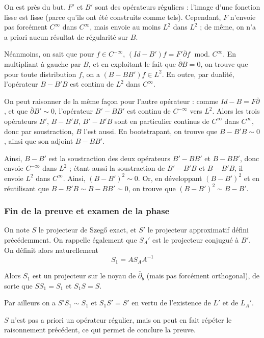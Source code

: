 On est près du but. $F'$ et $B'$ sont des opérateurs réguliers : l'image d'une fonction lisse est lisse (parce qu'ils ont été construits comme tels). Cependant, $F$ n'envoie pas forcément $C^{\infty}$ dans $C^{\infty}$, mais envoie au moins $L^2$ dans $L^2$ ; de même, on n'a a priori aucun résultat de régularité sur $B$.

Néanmoins, on sait que pour $f \in C^{-\infty}$, $(Id-B')f = F'\overline{\partial}f\; \text{ mod. } C^{\infty}$. En multipliant à gauche par $B$, et en exploitant le fait que $\overline{\partial}B=0$, on trouve que pour toute distribution $f$, on a $(B-BB')f \in L^2$. En outre, par dualité, l'opérateur $B-B'B$ est continu de $L^2$ dans $C^{\infty}$.

On peut raisonner de la même façon pour l'autre opérateur : comme $Id-B = F\overline{\partial}$, et que $\overline{\partial}B' \sim 0$, l'opérateur $B'-BB'$ est continu de $C^{-\infty}$ vers $L^2$. Alors les trois opérateurs $B'$, $B-B'B$, $B'-B'B$ sont en particulier continus de $C^{\infty}$ dans $C^{\infty}$, donc par soustraction, $B$ l'est aussi. En bootstrapant, on trouve que $B-B'B \sim 0$, ainsi que son adjoint $B-BB'$.

Ainsi, $B-B'$ est la soustraction des deux opérateurs $B'-BB'$ et $B-BB'$, donc envoie $C^{-\infty}$ dans $L^2$ ; étant aussi la soustraction de $B'-B'B$ et $B-B'B$, il envoie $L^2$ dans $C^{\infty}$. Ainsi, $(B-B')^2 \sim 0$. Or, en développant $(B-B')^2$ et en réutilisant que $B-B'B \sim B-BB' \sim 0$, on trouve que $(B-B')^2 \sim B-B'$.

\subsubsection{Fin de la preuve et examen de la phase}

On note $S$ le projecteur de Szeg\H{o} exact, et $S'$ le projecteur approximatif défini précédemment. On rappelle également que $S_A'$ est le projecteur conjugué à $B'$. On définit alors naturellement 
\begin{equation*}
  S_1 = AS_AA^{-1}
\end{equation*}

Alors $S_1$ est un projecteur sur le noyau de $\overline{\partial}_b$ (mais pas forcément orthogonal), de sorte que $SS_1=S_1$ et $S_1S=S$.

Par ailleurs on a $S'S_1 \sim S_1$ et $S_1S'=S'$ en vertu de l'existence de $L'$ et de $L_A'$.

$S$ n'est pas a priori un opérateur régulier, mais on peut en fait
répéter le raisonnement précédent, ce qui permet de conclure la preuve.

